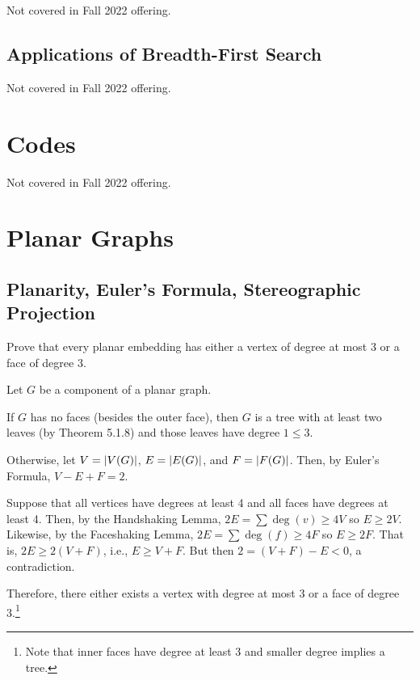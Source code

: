 \documentclass[class=math239,notes,tikz]{agony}
\begin{document}
Not covered in Fall 2022 offering.

\subsection{Applications of Breadth-First Search}

Not covered in Fall 2022 offering.

\section{Codes}

Not covered in Fall 2022 offering.

\section{Planar Graphs}

\setcounter{subsection}{2}
\subsection{Planarity, Euler's Formula, Stereographic Projection}

\begin{xca}
  Prove that every planar embedding has either a vertex of degree at most 3
  or a face of degree 3.
\end{xca}
\begin{prf}
  Let $G$ be a component of a planar graph.

  If $G$ has no faces (besides the outer face),
  then $G$ is a tree with at least two leaves (by Theorem 5.1.8)
  and those leaves have degree $1 \leq 3$.

  Otherwise, let $V = \abs{V(G)}$,
  $E = \abs{E(G)}$, and $F = \abs{F(G)}$.
  Then, by Euler's Formula, $V - E + F = 2$.

  Suppose that all vertices have degrees at least 4
  and all faces have degrees at least 4.
  Then, by the Handshaking Lemma, $2E = \sum \deg(v) \geq 4V$ so $E \geq 2V$.
  Likewise, by the Faceshaking Lemma, $2E = \sum \deg(f) \geq 4F$ so $E \geq 2F$.
  That is, $2E \geq 2(V + F)$, i.e., $E \geq V + F$.
  But then $2 = (V + F) - E < 0$, a contradiction.

  Therefore, there either exists a vertex with degree at most 3
  or a face of degree 3.\footnote{Note that inner faces have degree at least 3
    and smaller degree implies a tree.}
\end{prf}
\end{document}
